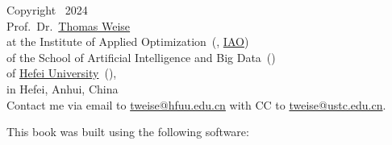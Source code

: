 \begin{flushleft}%
Copyright \textcopyright\ 2024\\[3pt]%
Prof.~Dr.~\href{http://iao.hfuu.edu.cn/5}{Thomas Weise}~\\%
at the Institute of Applied Optimization~(, \href{http://iao.hfuu.edu.cn}{IAO})\\%
of the School of Artificial Intelligence and Big Data~(\href{http://www.hfuu.edu.cn/jsjx/}{})\\%
of \href{http://www.hfuu.edu.cn/english}{Hefei University}~(\href{http://www.hfuu.edu.cn}{}),\\%
in Hefei, Anhui, China~\\[6pt]%
Contact me via email to \href{mailto:tweise@hfuu.edu.cn}{tweise@hfuu.edu.cn} with CC to \href{mailto:tweise@ustc.edu.cn}{tweise@ustc.edu.cn}.%
\end{flushleft}%
%
\clearpage%
%
\strut\vfill\strut%
This book was built using the following software:%
%
